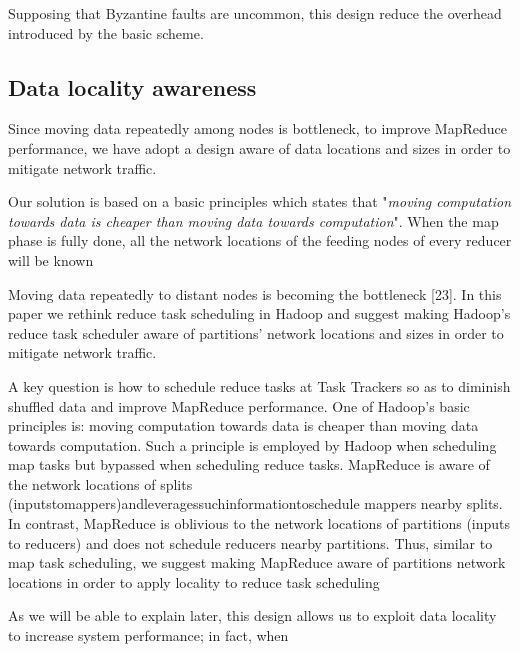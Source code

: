 \documentclass[sigchi]{acmart}
\begin{document}
Supposing that Byzantine faults are uncommon, this design reduce the overhead introduced by the basic scheme.

\subsection{Data locality awareness}

Since moving data repeatedly among nodes is bottleneck, to improve MapReduce performance, we have adopt a design aware of data locations and sizes in order to mitigate network traffic.

Our solution is based on a basic principles which states that "\textit{moving computation towards data is cheaper than moving data towards computation}". When the map phase is fully done, all the network locations of the feeding nodes of every reducer will be known


Moving data repeatedly to distant nodes is becoming the bottleneck [23]. In this paper we rethink reduce task scheduling in Hadoop and suggest making Hadoop’s reduce task scheduler aware of partitions’ network locations and sizes in order to mitigate network traffic. 

A key question is how to schedule reduce tasks at Task Trackers so as to diminish shuffled data and improve MapReduce performance. One of Hadoop’s basic principles is: moving computation towards data is cheaper than moving data towards computation. Such a principle is employed by Hadoop when scheduling map tasks but bypassed when scheduling reduce tasks. MapReduce is aware of the network locations of splits (inputstomappers)andleveragessuchinformationtoschedule mappers nearby splits. In contrast, MapReduce is oblivious to the network locations of partitions (inputs to reducers) and does not schedule reducers nearby partitions. Thus, similar to map task scheduling, we suggest making MapReduce aware of partitions network locations in order to apply locality to reduce task scheduling



As we will be able to explain later, this design allows us to exploit data locality to increase system performance; in fact, when 
\end{document}

